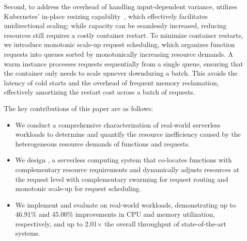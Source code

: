 Second, to address the overhead of handling input-dependent variance, \sysname utilizes Kubernetes' in-place resizing capability~\cite{Doc:K8s_Pod_Resize}, which effectively facilitates unidirectional scaling; while capacity can be seamlessly increased, reducing resources still requires a costly container restart. To minimize container restarts, we introduce monotonic scale-up request scheduling, which organizes function requests into queues sorted by monotonically increasing resource demands. A warm instance processes requests sequentially from a single queue, ensuring that the container only needs to scale up\textemdash never down\textemdash during a batch. This avoids the latency of cold starts and the overhead of frequent memory reclamation, effectively amortizing the restart cost across a batch of requests.

The key contributions of this paper are as follows:
\begin{itemize}
    \item We conduct a comprehensive characterization of real-world serverless workloads to determine and quantify the resource inefficiency caused by the heterogeneous resource demands of functions and requests.
    \item We design \sysname, a serverless computing system that co-locates functions with complementary resource requirements and dynamically adjusts resources at the request level with complementary swarming for request routing and monotonic scale-up for request scheduling.
    \item We implement and evaluate \sysname on real-world workloads, demonstrating up to 46.91\% and 45.00\% improvements in CPU and memory utilization, respectively, and up to 2.01$\times$ the overall throughput of state-of-the-art systems.
\end{itemize}
